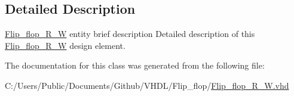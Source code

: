 \subsection{Detailed Description}
\hyperlink{class_flip__flop___r___w}{Flip\+\_\+flop\+\_\+\+R\+\_\+W} entity brief description Detailed description of this \hyperlink{class_flip__flop___r___w}{Flip\+\_\+flop\+\_\+\+R\+\_\+W} design element. 

The documentation for this class was generated from the following file\+:\begin{DoxyCompactItemize}
\item 
C\+:/\+Users/\+Public/\+Documents/\+Github/\+V\+H\+D\+L/\+Flip\+\_\+flop/\hyperlink{_flip__flop___r___w_8vhd}{Flip\+\_\+flop\+\_\+\+R\+\_\+\+W.\+vhd}\end{DoxyCompactItemize}
